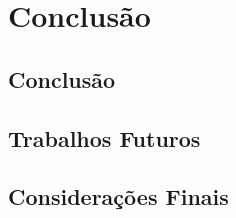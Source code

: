 
\chapter{Conclusão}


\section{Conclusão}

\section{Trabalhos Futuros}

\section{Considerações Finais}
